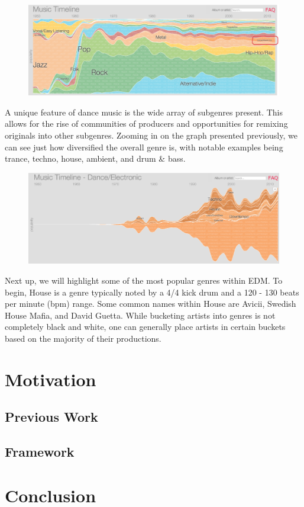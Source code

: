 \documentclass[12pt]{dalcsthesis}
\begin{document}
\begin{figure}[h]
\includegraphics[scale=.49]{genre_graph}
\centering
\end{figure}

A unique feature of dance music is the wide array of subgenres present. This allows for the rise of communities of producers and opportunities for remixing originals into other subgenres. Zooming in on the graph presented previously, we can see just how diversified the overall genre is, with notable examples being trance, techno, house, ambient, and drum \& bass. \newpage

\begin{figure}[h]
\includegraphics[scale=.65]{subgenre_graph}
\centering
\end{figure}

Next up, we will highlight some of the most popular genres within EDM. To begin, House is a genre typically noted by a 4/4 kick drum and a 120 - 130 beats per minute (bpm) range. Some common names within House are Avicii, Swedish House Mafia, and David Guetta. While bucketing artists into genres is not completely black and white, one can generally place artists in certain buckets based on the majority of their productions.

\chapter{Motivation}

\section{Previous Work}

\section{Framework}

\chapter{Conclusion}



\end{document}
